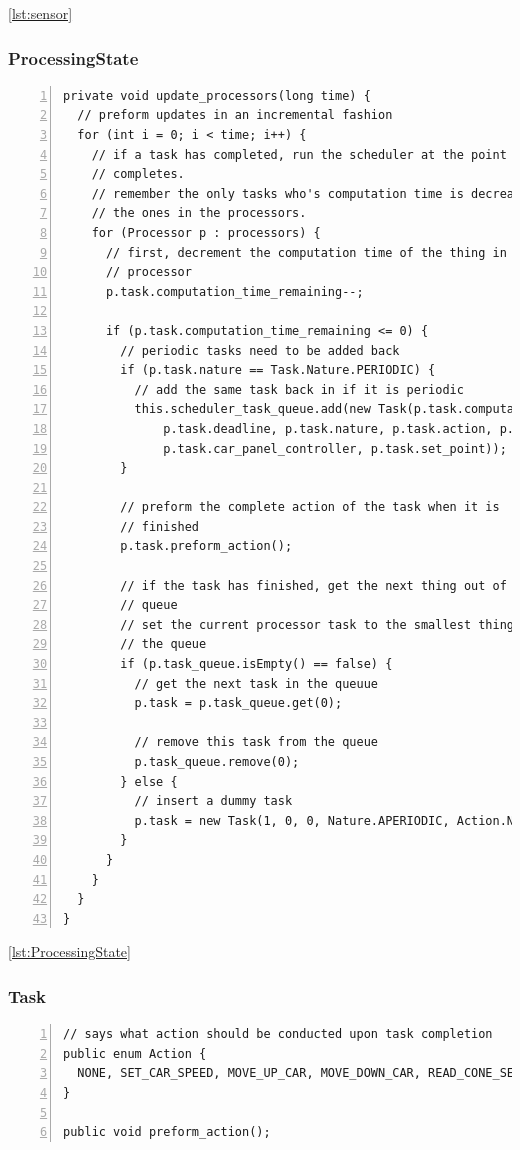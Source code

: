 \documentclass{article} %
\begin{document}
\ref{lst:sensor}

\subsubsection{ProcessingState}
\begin{lstlisting}[float=*,caption={Scheduler call and task queue manipulation},label={lst:ProcessingState},numbers=left]
private void update_processors(long time) {
  // preform updates in an incremental fashion
  for (int i = 0; i < time; i++) {
    // if a task has completed, run the scheduler at the point it
    // completes.
    // remember the only tasks who's computation time is decreasing are
    // the ones in the processors.
    for (Processor p : processors) {
      // first, decrement the computation time of the thing in this
      // processor
      p.task.computation_time_remaining--;

      if (p.task.computation_time_remaining <= 0) {
        // periodic tasks need to be added back
        if (p.task.nature == Task.Nature.PERIODIC) {
          // add the same task back in if it is periodic
          this.scheduler_task_queue.add(new Task(p.task.computation_time_origional, p.task.period,
              p.task.deadline, p.task.nature, p.task.action, p.task.processing_controller,
              p.task.car_panel_controller, p.task.set_point));
        }

        // preform the complete action of the task when it is
        // finished
        p.task.preform_action();

        // if the task has finished, get the next thing out of the
        // queue
        // set the current processor task to the smallest thing in
        // the queue
        if (p.task_queue.isEmpty() == false) {
          // get the next task in the queuue
          p.task = p.task_queue.get(0);

          // remove this task from the queue
          p.task_queue.remove(0);
        } else {
          // insert a dummy task
          p.task = new Task(1, 0, 0, Nature.APERIODIC, Action.NONE, null, null, 0);
        }
      }
    }
  }
}
\end{lstlisting}

\ref{lst:ProcessingState}

\subsubsection{Task}
\begin{lstlisting}[caption={Tasks know how to preform their actions},label={lst:task},numbers=left]
// says what action should be conducted upon task completion
public enum Action {
  NONE, SET_CAR_SPEED, MOVE_UP_CAR, MOVE_DOWN_CAR, READ_CONE_SENSOR, READ_OTHER_CAR_SENSOR, READ_SPEED_SIGN_SENSOR, READ_STOP_SIGN_SENSOR;
}

public void preform_action();
\end{lstlisting}
\end{document}
